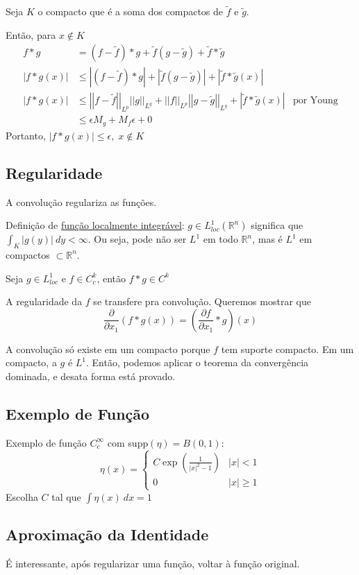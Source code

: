 \documentclass[11pt]{article}
\newcommand{\Rn}{{\mathbb{R}^n}}
\newcommand{\p}{\partial}
\newcommand{\e}{\epsilon}
\newcommand{\pde}[2]{\frac{\p #1}{\p #2}}
\newcommand{\norm}[2]{\left|\left|#1\right|\right|_{L^{#2}}}
\begin{document}
Seja \(K\) o compacto que é a soma dos compactos de \(\tilde{f}\) e \(\tilde{g}\).

Então, para \(x \notin K\)
\begin{align*}
	f*g &= (f - \tilde{f}) * g + \tilde{f}(g - \tilde{g}) + \tilde{f}*\tilde{g} \\
	|f*g (x)| &\leq |(f - \tilde{f}) * g| + |\tilde{f}(g - \tilde{g})| + |\tilde{f}*\tilde{g} (x)| \\
	|f*g (x)| &\leq \norm{f - \tilde{f}}{p}\norm{g}{q} + \norm{f}{p}\norm{g - \tilde{g}}{q} + \left| \tilde{f} * \tilde{g} (x) \right| & \text{por Young}\\
	&\leq \e M_g + M_f\e + 0 
\end{align*}
Portanto, \(\left| f*g(x)\right| \leq \e, \; x\notin K\)

\subsection{Regularidade}

A convolução regulariza as funções.

Definição de \href{https://en.wikipedia.org/wiki/Locally_integrable_function}{função localmente integrável}: \(g \in L^1_{loc}(\Rn)\) significa que \(\int_K |g(y)|\ dy < \infty\). Ou seja, pode não ser \(L^1\) em todo \(\Rn\), mas é \(L^1\) em compactos \(\subset \Rn\). 

Seja \( g \in L^1_{loc} \) e \( f \in C^k_c \), então \( f * g \in C^k \)

A regularidade da \(f\) se transfere pra convolução. Queremos mostrar que \[\pde{}{x_1}\left( f*g(x)\right) = \left(\pde{f}{x_1} * g \right)(x)\]

A convolução só existe em um compacto porque \(f\) tem suporte compacto. Em um compacto, a \(g\) é \(L^1\). Então, podemos aplicar o teorema da convergência dominada, e desata forma está provado.

\subsection*{Exemplo de Função}
Exemplo de função \(C^{\infty}_{c}\) com supp\((\eta) = B(0,1)\): \[\eta(x) = \begin{cases}
	C \exp\left( \frac{1}{|x|^2 - 1}\right) & |x|<1 \\
	0 & |x| \geq 1 
\end{cases}\]
Escolha \(C\) tal que \(\int \eta(x)\ dx = 1\)

\subsection{Aproximação da Identidade}
É interessante, após regularizar uma função, voltar à função original.
\end{document}
